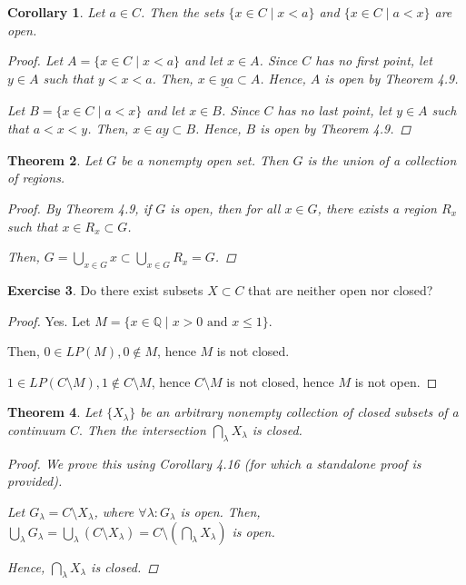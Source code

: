 \documentclass[11pt]{article}
\newcommand{\bbQ}{\mathbb{Q}}
\renewcommand{\_}[1]{\underline{ #1 }}
\newtheorem{theorem}{Theorem}[section]
\newtheorem{corollary}[theorem]{Corollary}
\theoremstyle{definition}
\newtheorem{exercise}[theorem]{Exercise}
\numberwithin{equation}{subsection}
\begin{document}
\begin{corollary}\label{cor:halfspace}  Let $a \in C$.  Then the sets $\{ x \in C \mid x < a\}$ and $\{x\in C \mid a < x \}$ are open.
\begin{proof}
Let $A = \{ x \in C \mid x < a\}$ and let $x \in A$. Since $C$ has no first point, let $y \in A$ such that $y<x<a$. Then, $x \in \_{ya} \subset A$. Hence, $A$ is open by Theorem 4.9.

Let $B = \{ x \in C \mid a < x\}$ and let $x \in B$. Since $C$ has no last point, let $y \in A$ such that $a<x<y$. Then, $x \in \_{ay} \subset B$. Hence, $B$ is open by Theorem 4.9.

\renewcommand\qedsymbol{QED}
\end{proof}
\end{corollary}

\begin{theorem}\label{union}  Let $G$ be a nonempty open set.  Then $G$ is the union of a collection of regions. 
\begin{proof}
By Theorem 4.9, if $G$ is open, then for all $x \in G$, there exists a region $R_x$ such that $x \in R_x \subset G$. 

Then, $G = \bigcup_{x \in G}x \subset \bigcup_{x \in G}R_x = G$.


\renewcommand\qedsymbol{QED}
\end{proof}
\end{theorem}




\begin{exercise}  Do there exist subsets $X \subset C$ that are neither open nor closed?
\begin{proof}
Yes. Let $M = \{x \in \bbQ \mid x >0 \text{ and } x \leq 1\}$. 

Then, $0 \in LP(M), 0 \notin M$, hence $M$ is not closed.

$1 \in LP(C \setminus M), 1 \notin C \setminus M$, hence $C \setminus M$ is not closed, hence $M$ is not open.

\renewcommand\qedsymbol{QED}
\end{proof}
\end{exercise}



\begin{theorem}  Let $\{X_{\lambda} \}$ be an arbitrary nonempty collection of closed subsets of a continuum $C.$  Then the intersection $\bigcap_{\lambda} X_{\lambda} $ is closed.
\begin{proof}
We prove this using Corollary 4.16 (for which a standalone proof is provided). 

Let $G_\lambda = C \setminus X_\lambda$, where $\forall \lambda: G_\lambda$ is open. Then, $\bigcup_{\lambda} G_{\lambda} = \bigcup_{\lambda} (C \setminus X_{\lambda}) = C \setminus (\bigcap_{\lambda} X_{\lambda})$ is open.

Hence, $\bigcap_{\lambda} X_{\lambda}$ is closed.


\renewcommand\qedsymbol{QED}
\end{proof}
\end{theorem}
\end{document}
